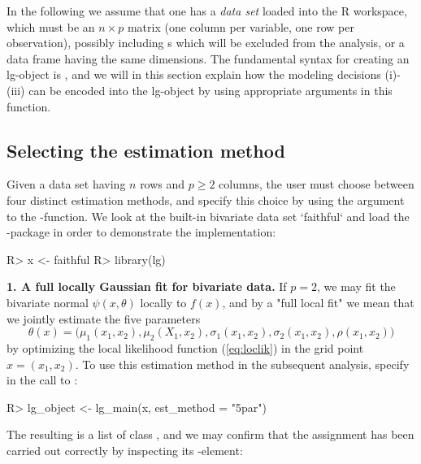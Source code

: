 In the following we assume that one has a \emph{data set}  loaded into the R workspace, which must be an $n\times p$ matrix (one column per variable, one row per observation), possibly including s which will be excluded from the analysis, or a data frame having the same dimensions. The fundamental syntax for creating an lg-object is , and we will in this section explain how the modeling decisions (i)-(iii) can be encoded into the lg-object by using appropriate arguments in this function.

\subsection{Selecting the estimation method}
\label{chap:est-method}

Given a data set  having $n$ rows and $p \geq 2$ columns, the user must choose between four distinct estimation methods, and specify this choice by using the argument  to the -function. We look at the built-in bivariate data set `faithful` and load the -package in order to demonstrate the implementation:

\begin{example}
R> x <- faithful
R> library(lg)
\end{example}

\textbf{1. A full locally Gaussian fit for bivariate data.} If $p = 2$, we may fit the bivariate normal $\psi(x, \theta)$ locally to $f(x)$, and by a "full local fit" we mean that we jointly estimate the five parameters
$$\theta(x) = \big(\mu_1(x_1, x_2), \mu_2(X_1, x_2), \sigma_1(x_1, x_2), \sigma_2(x_1,x_2),\rho(x_1, x_2)\big)$$
by optimizing the local likelihood function (\ref{eq:loclik}) in the grid point $x = (x_1, x_2)$. To use this estimation method in the subsequent analysis, specify  in the call to :

\begin{example}
R> lg_object <- lg_main(x, est_method = "5par")
\end{example}
The resulting  is a list of class , and we may confirm that the assignment has been carried out correctly by inspecting its -element:

